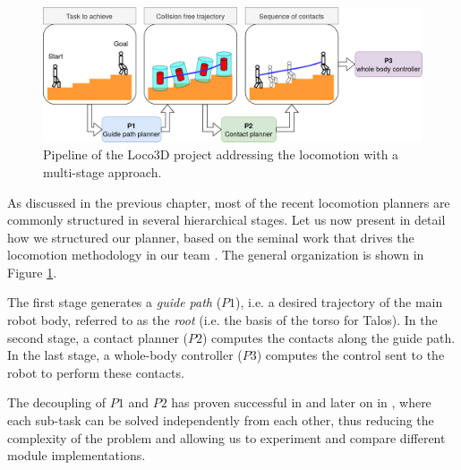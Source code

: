 \begin{figure}[h!]
    \centering
    \includegraphics[width=\textwidth]{Figures/Chapter_LEAS/pipeline.png}
    \caption{Pipeline of the Loco3D project addressing the locomotion with a multi-stage approach.}
    \label{fig:pipeline}
\end{figure}


As discussed in the previous chapter, most of the recent locomotion planners are commonly structured in several hierarchical stages. 
Let us now present in detail how we structured our planner, based on the seminal work that drives the locomotion methodology in our team \cite{loco3d}.
The general organization is shown in Figure \ref{fig:pipeline}.

The first stage generates a \textit{guide path} ($P1$), i.e. a desired trajectory of the main robot body, referred to as the \textit{root} (i.e. the basis of the torso for Talos). In the second stage, a contact planner ($P2$) computes the contacts along the guide path. In the last stage, a whole-body controller ($P3$) computes the control sent to the robot to perform these contacts.

The decoupling of $P1$ and $P2$ has proven successful in \cite{Escande2008Guide, bouyarmane2009} and later on in \cite{loco3d, RB-PRM}, where each sub-task can be solved independently from each other, thus reducing the complexity of the problem and allowing us to experiment and compare different module implementations. 

